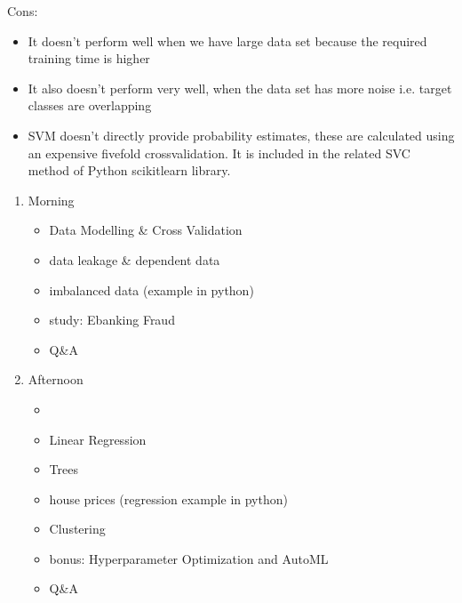 \documentclass[letterpaper,10pt,english]{jupyterBook}
\begin{document}
\sphinxAtStartPar
Cons:
\begin{itemize}
\item {} 
\sphinxAtStartPar
It doesn’t perform well when we have large data set because the required training time is higher

\item {} 
\sphinxAtStartPar
It also doesn’t perform very well, when the data set has more noise i.e. target classes are overlapping

\item {} 
\sphinxAtStartPar
SVM doesn’t directly provide probability estimates, these are calculated using an expensive five\sphinxhyphen{}fold cross\sphinxhyphen{}validation. It is included in the related SVC method of Python scikit\sphinxhyphen{}learn library.

\end{itemize}
\begin{enumerate}
%
\item {} 
\sphinxAtStartPar
Morning
\begin{itemize}
\item {} 
\sphinxAtStartPar
Data Modelling \& Cross Validation

\item {} 
\sphinxAtStartPar
data leakage \& dependent data

\item {} 
\sphinxAtStartPar
imbalanced data (example in python)

\item {} 
\sphinxAtStartPar
study: Ebanking Fraud

\item {} 
\sphinxAtStartPar
Q\&A

\end{itemize}



\item {} 
\sphinxAtStartPar
Afternoon
\begin{itemize}
\item {} 
\sphinxAtStartPar
{}

\item {} 
\sphinxAtStartPar
Linear Regression

\item {} 
\sphinxAtStartPar
Trees

\item {} 
\sphinxAtStartPar
house prices (regression example in python)

\item {} 
\sphinxAtStartPar
Clustering

\item {} 
\sphinxAtStartPar
bonus: Hyperparameter Optimization and AutoML

\item {} 
\sphinxAtStartPar
Q\&A

\end{itemize}

\end{enumerate}
\end{document}
